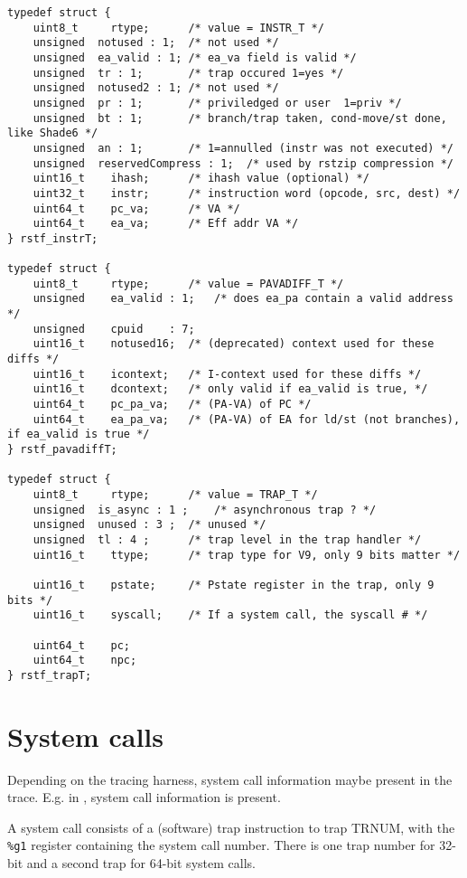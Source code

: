 \documentclass[10pt]{article}
\begin{document}
\begin{verbatim}
typedef struct {
    uint8_t     rtype;		/* value = INSTR_T */
    unsigned  notused : 1;	/* not used */
    unsigned  ea_valid : 1;	/* ea_va field is valid */
    unsigned  tr : 1;		/* trap occured 1=yes */
    unsigned  notused2 : 1;	/* not used */
    unsigned  pr : 1;		/* priviledged or user  1=priv */
    unsigned  bt : 1;		/* branch/trap taken, cond-move/st done, like Shade6 */
    unsigned  an : 1;		/* 1=annulled (instr was not executed) */
    unsigned  reservedCompress : 1;  /* used by rstzip compression */
    uint16_t    ihash;		/* ihash value (optional) */
    uint32_t    instr;		/* instruction word (opcode, src, dest) */
    uint64_t    pc_va;		/* VA */
    uint64_t    ea_va;		/* Eff addr VA */
} rstf_instrT;

typedef struct {
    uint8_t     rtype;		/* value = PAVADIFF_T */
    unsigned    ea_valid : 1;	/* does ea_pa contain a valid address */
    unsigned    cpuid    : 7;	
    uint16_t    notused16;	/* (deprecated) context used for these diffs */
    uint16_t    icontext;	/* I-context used for these diffs */
    uint16_t    dcontext;	/* only valid if ea_valid is true, */
    uint64_t    pc_pa_va;	/* (PA-VA) of PC */
    uint64_t    ea_pa_va;	/* (PA-VA) of EA for ld/st (not branches), if ea_valid is true */
} rstf_pavadiffT;

typedef struct {
    uint8_t     rtype;		/* value = TRAP_T */
    unsigned  is_async : 1 ;	/* asynchronous trap ? */
    unsigned  unused : 3 ;	/* unused */
    unsigned  tl : 4 ;		/* trap level in the trap handler */
    uint16_t    ttype;		/* trap type for V9, only 9 bits matter */

    uint16_t    pstate;		/* Pstate register in the trap, only 9 bits */
    uint16_t    syscall;	/* If a system call, the syscall # */

    uint64_t    pc;
    uint64_t    npc;
} rstf_trapT;
\end{verbatim}

\section{System calls}

Depending on the tracing harness, system call information maybe present
in the trace.  E.g. in , system call information is
present.  

A system call consists of a (software) trap instruction to trap TRNUM,
with the \texttt{\%g1} register containing the system call number.
There is one trap number for 32-bit and a second trap for 64-bit system
calls.
\end{document}
